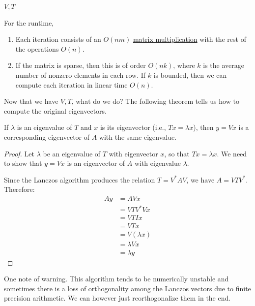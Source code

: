 \begin{algo}
\begin{algorithm}[H]
\begin{algorithmic}[1]
        \State \Return $V, T$
        \EndProcedure
      \end{algorithmic}
    \end{algorithm} 

    For the runtime, 
    \begin{enumerate}
      \item Each iteration consists of an $O(nm)$ \hyperref[lin-def:matrix-multiplication]{matrix multiplication} with the rest of the operations $O(n)$. 
      \item If the matrix is sparse, then this is of order $O(nk)$, where $k$ is the average number of nonzero elements in each row. If $k$ is bounded, then we can compute each iteration in linear time $O(n)$. 
    \end{enumerate}
  \end{algo} 

  Now that we have $V, T$, what do we do? The following theorem tells us how to compute the original eigenvectors.  

  \begin{theorem}
    \label{thm:eigenvalues-of-a-shifted-operator}
    If $\lambda$ is an eigenvalue of $T$ and $x$ is its eigenvector (i.e., $Tx = \lambda x$), then $y = Vx$ is a corresponding eigenvector of $A$ with the same eigenvalue.
  \end{theorem}
  \begin{proof}
    Let $\lambda$ be an eigenvalue of $T$ with eigenvector $x$, so that $Tx = \lambda x$. We need to show that $y = Vx$ is an eigenvector of $A$ with eigenvalue $\lambda$.

    Since the Lanczos algorithm produces the relation $T = V^* A V$, we have $A = VTV^*$. Therefore:
    \begin{align}
      Ay &= AVx \\
         &= VTV^* Vx \\
         &= VTIx \\
         &= VTx \\
         &= V(\lambda x) \\
         &= \lambda Vx \\
         &= \lambda y
    \end{align}
  \end{proof}

  One note of warning. This algorithm tends to be numerically unstable and sometimes there is a loss of orthogonality among the Lanczos vectors due to finite precision arithmetic. We can however just reorthogonalize them in the end. 

